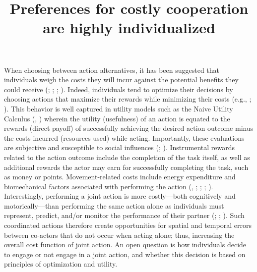 \documentclass[
  man,
  floatsintext,
  longtable,
  nolmodern,
  notxfonts,
  notimes,
  colorlinks=true,linkcolor=blue,citecolor=blue,urlcolor=blue]{apa7}
\title{Preferences for costly cooperation are highly individualized}
\begin{document}
\maketitle


\setcounter{secnumdepth}{-\maxdimen} %

\setlength\LTleft{0pt}

\resetlinenumber[1]

When choosing between action alternatives, it has been suggested that
individuals weigh the costs they will incur against the potential
benefits they could receive (; ;
;
). Indeed, individuals
tend to optimize their decisions by choosing actions that maximize their
rewards while minimizing their costs (e.g.,
;
). This behavior is well
captured in utility models such as the Naive Utility Calculus
(,
) wherein the utility (usefulness)
of an action is equated to the rewards (direct payoff) of successfully
achieving the desired action outcome minus the costs incurred (resources
used) while acting. Importantly, these evaluations are subjective and
susceptible to social influences (; ).
Instrumental rewards related to the action outcome include the
completion of the task itself, as well as additional rewards the actor
may earn for successfully completing the task, such as money or points.
Movement-related costs include energy expenditure and biomechanical
factors associated with performing the action
(, ;
;
;
). Interestingly, performing a
joint action is more costly---both cognitively and motorically---than
performing the same action alone as individuals must represent, predict,
and/or monitor the performance of their partner
(;
;
). Such coordinated
actions therefore create opportunities for spatial and temporal errors
between co-actors that do not occur when acting alone; thus, increasing
the overall cost function of joint action. An open question is how
individuals decide to engage or not engage in a joint action, and
whether this decision is based on principles of optimization and
utility.
\end{document}
